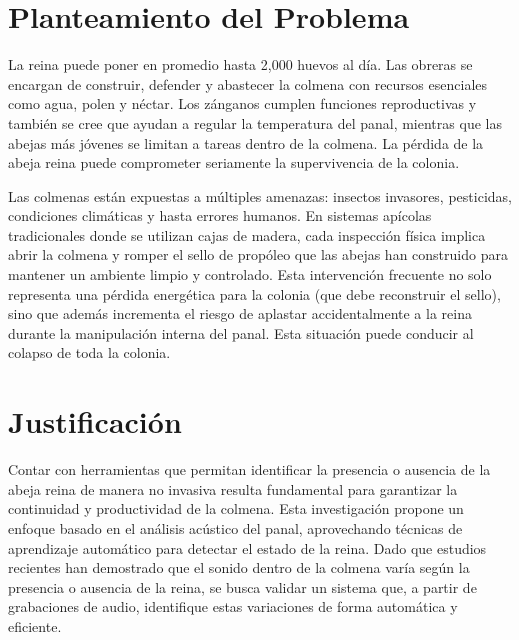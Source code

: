 \documentclass[12pt]{report}
\newenvironment{tightmulticols}{%
  \begin{multicols}{2}
  \setlength{\parskip}{0pt}
  \setlength{\parindent}{0em}
  \linespread{1}\selectfont
}{%
  \end{multicols}
}
\begin{document}
\begin{tightmulticols}

\section{Planteamiento del Problema}

\par La reina puede poner en promedio hasta 2,000 huevos al día. Las obreras se encargan de construir, defender y abastecer la colmena con recursos esenciales como agua, polen y néctar\cite{winston1987temperate}. Los zánganos cumplen funciones reproductivas y también se cree que ayudan a regular la temperatura del panal, mientras que las abejas más jóvenes se limitan a tareas dentro de la colmena\cite{johnson2010division}. La pérdida de la abeja reina puede comprometer seriamente la supervivencia de la colonia.

\par Las colmenas están expuestas a múltiples amenazas: insectos invasores, pesticidas, condiciones climáticas y hasta errores humanos. En sistemas apícolas tradicionales donde se utilizan cajas de madera, cada inspección física implica abrir la colmena y romper el sello de propóleo que las abejas han construido para mantener un ambiente limpio y controlado. Esta intervención frecuente no solo representa una pérdida energética para la colonia (que debe reconstruir el sello), sino que además incrementa el riesgo de aplastar accidentalmente a la reina durante la manipulación interna del panal. Esta situación puede conducir al colapso de toda la colonia.


\section{Justificación}

\par Contar con herramientas que permitan identificar la presencia o ausencia de la abeja reina de manera no invasiva resulta fundamental para garantizar la continuidad y productividad de la colmena. Esta investigación propone un enfoque basado en el análisis acústico del panal, aprovechando técnicas de aprendizaje automático para detectar el estado de la reina. Dado que estudios recientes han demostrado que el sonido dentro de la colmena varía según la presencia o ausencia de la reina\cite{ruvinga2021use, maarefremote, hunter2013signal, ruvinga2023identifying}, se busca validar un sistema que, a partir de grabaciones de audio, identifique estas variaciones de forma automática y eficiente.


\end{tightmulticols}
\end{document}
